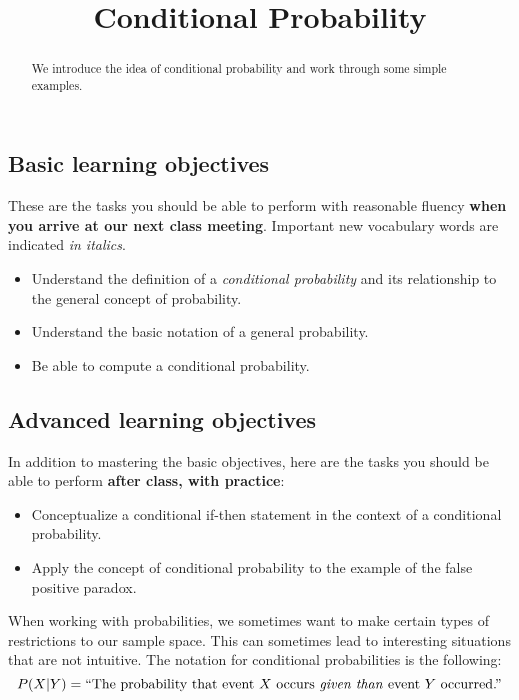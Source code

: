 \documentclass{ximera}
\title{Conditional Probability}
\begin{document}
\begin{abstract}
We introduce the idea of conditional probability and work through some simple examples.
\end{abstract}
\maketitle

\subsection*{Basic learning objectives}

These are the tasks you should be able to perform with reasonable fluency \textbf{when you arrive at our next class meeting}. Important new vocabulary words are indicated \emph{in italics}. 

\begin{itemize}
	\item Understand the definition of a \emph{conditional probability} and its relationship to the general concept of probability.
    \item Understand the basic notation of a general probability.
    \item Be able to compute a conditional probability.
\end{itemize}

\subsection*{Advanced learning objectives}

In addition to mastering the basic objectives, here are the tasks you should be able to perform \textbf{after class, with practice}: 

\begin{itemize}
	\item Conceptualize a conditional if-then statement in the context of a conditional probability.
    \item Apply the concept of conditional probability to the example of the false positive paradox.
\end{itemize}

When working with probabilities, we sometimes want to make certain types of restrictions to our sample space. This can sometimes lead to interesting situations that are not intuitive. The notation for conditional probabilities is the following:
\[ P(X | Y) = \text{``The probability that event $X$ occurs \emph{given than} event $Y$ occurred.''} \]
\end{document}
